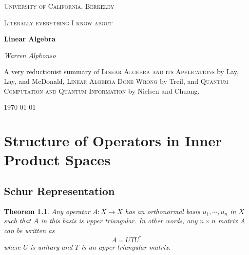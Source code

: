 \documentclass[a4paper,10pt]{book}
\theoremstyle{plain}
\newtheorem{theorem}{Theorem}[section]
\theoremstyle{plain}
\theoremstyle{definition}
\begin{document}
\frontmatter 
{\let\cleardoublepage\clearpage 
\begin{titlepage}
	\centering
	\vspace{1cm}
	{\scshape\LARGE University of California, Berkeley \par}
	\vspace{4cm}
	{\scshape\Large Literally everything I know about \par}
	\vspace{1.5cm}
	{\Huge\bfseries Linear Algebra\par}
	\vspace{1cm}
	\vspace{2.5cm}
	{\Large\itshape Warren Alphonso\par}
	\vfill
	{\large A very reductionist summary of \textsc{Linear Algebra and its Applications} by Lay, Lay, and McDonald, \textsc{Linear Algebra Done Wrong} by Treil, and \textsc{Quantum Computation and Quantum Information} by Nielsen and Chuang. \par}
	\vfill
	{\large \today\par}
\end{titlepage}

\tableofcontents
}

\mainmatter



























\chapter{Structure of Operators in Inner Product Spaces}

\section{Schur Representation} 

\begin{theorem}
Any operator $A: X \rightarrow X$ has an orthonormal basis $u_{1}, \cdots, u_{n}$ in $X$ such that $A$ in this basis is upper triangular. In other words, any $n \times n$ matrix $A$ can be written as 
$$A = UTU^{*}$$
where $U$ is unitary and $T$ is an upper triangular matrix. 
\end{theorem}
\end{document}

